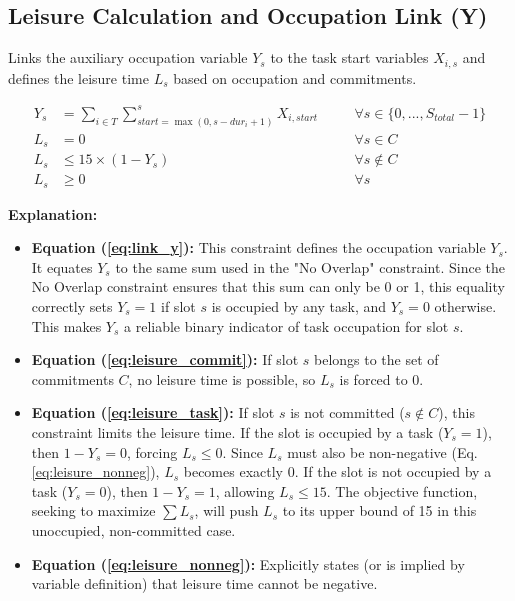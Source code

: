 \documentclass{article}
\begin{document}
\subsection{Leisure Calculation and Occupation Link (Y)}
Links the auxiliary occupation variable $Y_s$ to the task start variables $X_{i,s}$ and defines the leisure time $L_s$ based on occupation and commitments.

\begin{align}
Y_s &= \sum_{i \in T} \sum_{start = \max(0, s - dur_i + 1)}^{s} X_{i,start} \quad &&\forall s \in \{0, ..., S_{total}-1\} \label{eq:link_y} \\
L_s &= 0 \quad &&\forall s \in C \label{eq:leisure_commit} \\
L_s &\le 15 \times (1 - Y_s) \quad &&\forall s \notin C \label{eq:leisure_task} \\
L_s &\ge 0 \quad &&\forall s \label{eq:leisure_nonneg}
\end{align}

\textbf{Explanation:}
\begin{itemize}
    \item \textbf{Equation (\ref{eq:link_y}):} This constraint defines the occupation variable $Y_s$. It equates $Y_s$ to the same sum used in the "No Overlap" constraint. Since the No Overlap constraint ensures that this sum can only be 0 or 1, this equality correctly sets $Y_s = 1$ if slot $s$ is occupied by any task, and $Y_s = 0$ otherwise. This makes $Y_s$ a reliable binary indicator of task occupation for slot $s$.
    \item \textbf{Equation (\ref{eq:leisure_commit}):} If slot $s$ belongs to the set of commitments $C$, no leisure time is possible, so $L_s$ is forced to 0.
    \item \textbf{Equation (\ref{eq:leisure_task}):} If slot $s$ is not committed ($s \notin C$), this constraint limits the leisure time. If the slot is occupied by a task ($Y_s = 1$), then $1 - Y_s = 0$, forcing $L_s \le 0$. Since $L_s$ must also be non-negative (Eq. \ref{eq:leisure_nonneg}), $L_s$ becomes exactly 0. If the slot is not occupied by a task ($Y_s = 0$), then $1 - Y_s = 1$, allowing $L_s \le 15$. The objective function, seeking to maximize $\sum L_s$, will push $L_s$ to its upper bound of 15 in this unoccupied, non-committed case.
    \item \textbf{Equation (\ref{eq:leisure_nonneg}):} Explicitly states (or is implied by variable definition) that leisure time cannot be negative.
\end{itemize}
\end{document}

